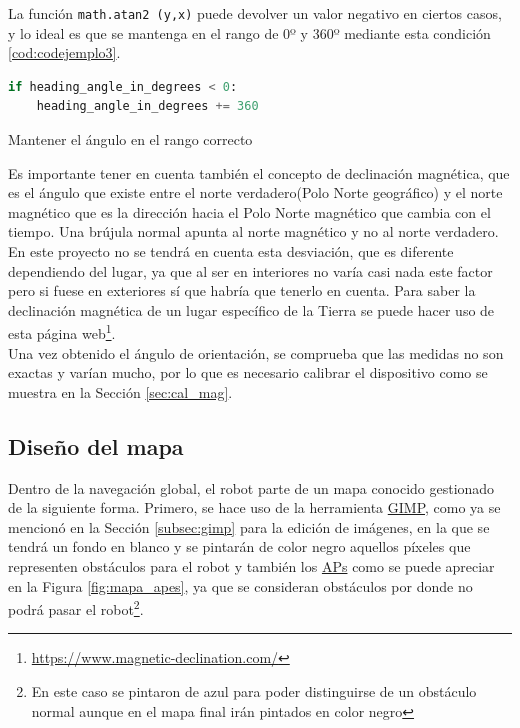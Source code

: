 La función \verb|math.atan2 (y,x)| puede devolver un valor negativo en ciertos casos, y lo ideal es que se mantenga en el rango de 0º y 360º mediante esta condición \ref{cod:codejemplo3}.


\begin{code}[H]
\begin{lstlisting}[language=Python]
if heading_angle_in_degrees < 0:
    heading_angle_in_degrees += 360
\end{lstlisting}
\caption[Mantener el ángulo en el rango correcto]{Mantener el ángulo en el rango correcto}
\label{cod:codejemplo3}
\end{code}


Es importante tener en cuenta también el concepto de declinación magnética, que es el ángulo que existe entre el norte verdadero(Polo Norte geográfico) y el norte magnético que es la dirección hacia el Polo Norte magnético que cambia con el tiempo. Una brújula normal apunta al norte magnético y no al norte verdadero. En este proyecto no se tendrá en cuenta esta desviación, que es diferente dependiendo del lugar, ya que al ser en interiores no varía casi nada este factor pero si fuese en exteriores sí que habría que tenerlo en cuenta. Para saber la declinación magnética de un lugar específico de la Tierra se puede hacer uso de esta página web\footnote{\url{https://www.magnetic-declination.com/}}.\\


Una vez obtenido el ángulo de orientación, se comprueba que las medidas no son exactas y varían mucho, por lo que es necesario calibrar el dispositivo como se muestra en la Sección \ref{sec:cal_mag}.



\subsection{Diseño del mapa}
\label{subsec:diseño_mapa}

Dentro de la navegación global, el robot parte de un mapa conocido gestionado de la siguiente forma. Primero, se hace uso de la herramienta \hyperlink{GIMP}{GIMP}, como ya se mencionó en la Sección \ref{subsec:gimp} para la edición de imágenes, en la que se tendrá un fondo en blanco y se pintarán de color negro aquellos píxeles que representen obstáculos para el robot y también los \hyperlink{APs}{APs} como se puede apreciar en la Figura \ref{fig:mapa_apes}, ya que se consideran obstáculos por donde no podrá pasar el robot\footnote{En este caso se pintaron de azul para poder distinguirse de un obstáculo normal aunque en el mapa final irán pintados en color negro}.

